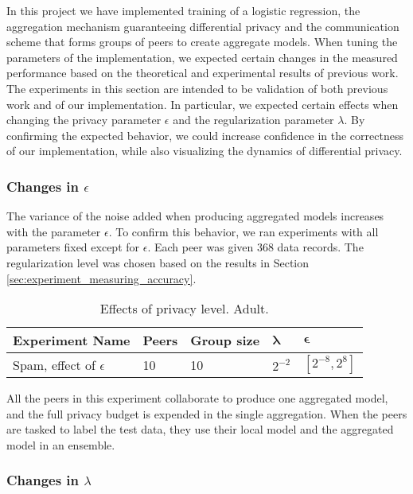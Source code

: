 In this project we have implemented training of a logistic regression, the aggregation mechanism guaranteeing differential privacy and the communication scheme that forms groups of peers to create aggregate models. When tuning the parameters of the implementation, we expected certain changes in the measured performance based on the theoretical and experimental results of previous work. The experiments in this section are intended to be validation of both previous work and of our implementation. In particular, we expected certain effects when changing the privacy parameter $\epsilon$ and the regularization parameter $\lambda$. By confirming the expected behavior, we could increase confidence in the correctness of our implementation, while also visualizing the dynamics of differential privacy.

\subsubsection{Changes in $\epsilon$}

The variance of the noise added when producing aggregated models increases with the parameter $\epsilon$. To confirm this behavior, we ran experiments with all parameters fixed except for $\epsilon$. Each peer was given 368 data records. The regularization level was chosen based on the results in Section \ref{sec:experiment_measuring_accuracy}.

\begin{table}[h]
	\centering
	\begin{tabular}{|l|l|l|l|l|}
		\textbf{Experiment Name}            & \textbf{Peers} & \textbf{Group size} &
		 $\boldsymbol{\lambda}$ & $\boldsymbol{\epsilon}$                                              \\
		 \hline
		Spam, effect of $\epsilon$ & 10    & 10  & $2^{-2}$  & $[2^{-8}, 2^{8}]$
	\end{tabular}
	\caption{Effects of privacy level. Adult.}
	\label{tab:experiments_privacy_level}
\end{table}

All the peers in this experiment collaborate to produce one aggregated model, and the full privacy budget is expended in the single aggregation. When the peers are tasked to label the test data, they use their local model and the aggregated model in an ensemble.

\subsubsection{Changes in $\lambda$}

